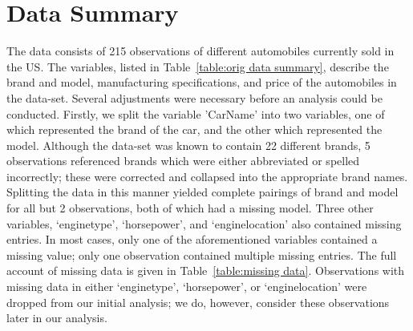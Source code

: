 \documentclass[a4paper, 10pt, titlepage]{article}
\begin{document}
\section{Data Summary}
The data consists of 215 observations of different automobiles currently sold in the US. The variables, listed in Table~\ref{table:orig data summary}, describe the brand and model, manufacturing specifications, and price of the automobiles in the data-set. Several adjustments were necessary before an analysis could be conducted. Firstly, we split the variable 'CarName' into two variables, one of which represented the brand of the car, and the other which represented the model. Although the data-set was known to contain 22 different brands, 5 observations referenced brands which were either abbreviated or spelled incorrectly; these were corrected and collapsed into the appropriate brand names. Splitting the data in this manner yielded complete pairings of brand and model for all but 2 observations, both of which had a missing model. Three other variables, `enginetype', `horsepower', and `enginelocation' also contained missing entries. In most cases, only one of the aforementioned variables contained a missing value; only one observation contained multiple missing entries. The full account of missing data is given in Table~\ref{table:missing data}. Observations with missing data in either `enginetype', `horsepower', or `enginelocation' were dropped from our initial analysis; we do, however, consider these observations later in our analysis.  
\end{document}
